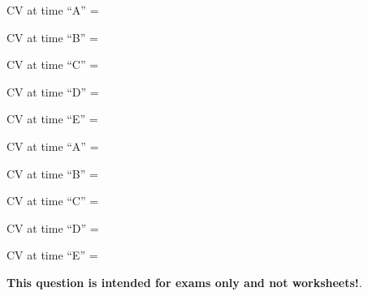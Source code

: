\vskip 10pt

CV at time ``A'' = \underbar{\hskip 50pt} 

\vskip 10pt

CV at time ``B'' = \underbar{\hskip 50pt} 

\vskip 10pt

CV at time ``C'' = \underbar{\hskip 50pt} 

\vskip 10pt

CV at time ``D'' = \underbar{\hskip 50pt} 

\vskip 10pt

CV at time ``E'' = \underbar{\hskip 50pt} 







CV at time ``A'' =  

\vskip 10pt

CV at time ``B'' =  

\vskip 10pt

CV at time ``C'' =  

\vskip 10pt

CV at time ``D'' =  

\vskip 10pt

CV at time ``E'' =  







{\bf This question is intended for exams only and not worksheets!}.



